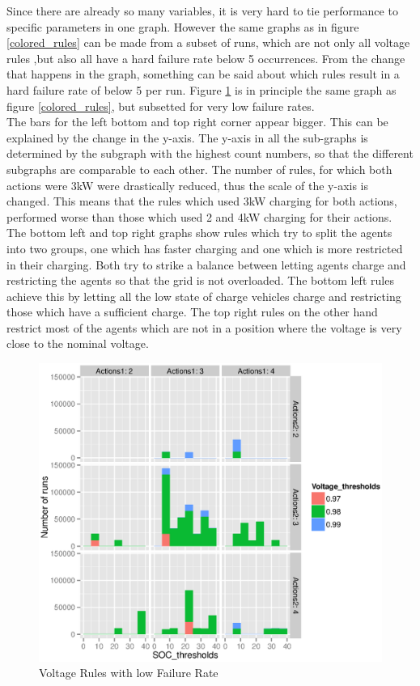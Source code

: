 \documentclass[a4paper]{article}
\begin{document}
Since there are already so many variables, it is very hard to tie performance to specific parameters in one graph. 
However the same graphs as in 
figure \ref{colored_rules} can be made from a subset of runs, which are not only all voltage rules ,but also all have a hard failure rate
below 5 occurrences. From the change that happens in the graph, something can be said about which rules result in a hard failure 
rate of below 5 per run. Figure \ref{colored_rules_low} is in principle the same graph as figure \ref{colored_rules}, but subsetted for 
very low failure rates. \\
The bars for the left bottom and top right corner appear bigger. This can be explained by the change in the y-axis. The y-axis in all 
the sub-graphs is determined by the subgraph with the highest count numbers, so that the different subgraphs are comparable to each other. 
The number of rules, for which both actions were 3kW were drastically reduced, thus the scale of the y-axis is changed. This means that 
the rules which used 3kW charging for both actions, performed worse than those which used 2 and 4kW charging for their actions. The bottom
left and top right graphs show rules which try to split the agents into two groups, one which has faster charging and one which is more 
restricted in their charging. Both try to strike a balance between letting agents charge and restricting the agents so that the grid is 
not overloaded. The bottom left rules achieve this by letting all the low state of charge vehicles charge and restricting those which 
have a sufficient charge. The top right rules on the other hand restrict most of the agents which are not in a position where the 
voltage is very close to the nominal voltage. 
\begin{figure}
\centering
 \includegraphics[width = \textwidth]{hard_failure_colored_low_look.eps}
 \caption{Voltage Rules with low Failure Rate}
  \label{colored_rules_low}
\end{figure}
\end{document}
